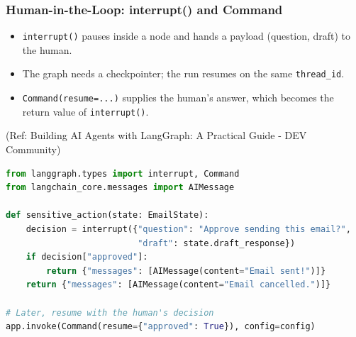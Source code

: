 \begin{frame}[fragile]\frametitle{Human-in-the-Loop: interrupt() and Command}
      \begin{itemize}
        \item \texttt{interrupt()} pauses inside a node and hands a payload (question, draft) to the human.
        \item The graph needs a checkpointer; the run resumes on the same \texttt{thread\_id}.
        \item \texttt{Command(resume=...)} supplies the human's answer, which becomes the return value of \texttt{interrupt()}.
      \end{itemize}
{\tiny (Ref: Building AI Agents with LangGraph: A Practical Guide - DEV Community)}

\begin{lstlisting}[language=Python]
from langgraph.types import interrupt, Command
from langchain_core.messages import AIMessage

def sensitive_action(state: EmailState):
    decision = interrupt({"question": "Approve sending this email?",
                          "draft": state.draft_response})
    if decision["approved"]:
        return {"messages": [AIMessage(content="Email sent!")]}
    return {"messages": [AIMessage(content="Email cancelled.")]}

# Later, resume with the human's decision
app.invoke(Command(resume={"approved": True}), config=config)
\end{lstlisting}
\end{frame}
